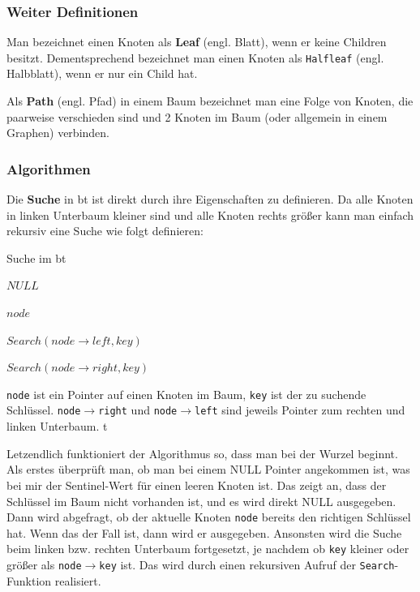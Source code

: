 \documentclass[11pt]{article}
\newcommand{\lstin}[1]{\lstinline[language=C]{#1}}
\begin{document}
\subsubsection{Weiter Definitionen}
Man bezeichnet einen Knoten als \textbf{Leaf} (engl. Blatt), wenn er keine Children besitzt. \cite[S. 36]{aic}
Dementsprechend bezeichnet man einen Knoten als \lstin{Halfleaf} (engl. Halbblatt), wenn er nur ein Child hat. 

Als \textbf{Path} (engl. Pfad) in einem Baum bezeichnet man eine Folge von Knoten, die paarweise verschieden sind und 2 Knoten im Baum (oder allgemein in einem Graphen) verbinden. \cite[S. 36]{aic}

\subsubsection{Algorithmen}

Die \textbf{Suche} in \gls{bt} ist direkt durch ihre Eigenschaften zu definieren. 
Da alle Knoten in linken Unterbaum kleiner sind und alle Knoten rechts größer kann man einfach rekursiv eine Suche wie folgt definieren:

\begin{algorithm}
  \caption{Suche im \gls{bt}}
  \begin{algorithmic}[1]
      
      \Return $NULL$
    \EndIf
      
      \Return $node$
      
      \Return $Search(node \rightarrow left, key)$
    \Else
      
      \Return $Search(node \rightarrow right, key)$
    \EndIf
  \EndProcedure
  \end{algorithmic}
\end{algorithm}

\lstin{node} ist ein Pointer auf einen Knoten im Baum, \lstin{key} ist der zu suchende Schlüssel.
\lstin{node}$\rightarrow$\lstin{right} und \lstin{node}$\rightarrow$\lstin{left} 
sind jeweils Pointer zum rechten und linken Unterbaum. t

Letzendlich funktioniert der Algorithmus so, dass man bei der Wurzel beginnt. 
Als erstes überprüft man, ob man bei einem NULL Pointer angekommen ist, was bei mir der Sentinel-Wert für einen leeren Knoten ist. 
Das zeigt an, dass der Schlüssel im Baum nicht vorhanden ist, und es wird direkt NULL ausgegeben.
Dann wird abgefragt, ob der aktuelle Knoten \lstin{node} bereits den richtigen Schlüssel hat. Wenn das der Fall ist, dann wird er ausgegeben.
Ansonsten wird die Suche beim linken bzw. rechten Unterbaum fortgesetzt, je nachdem ob \lstin{key} kleiner oder größer als \lstin{node}$\rightarrow$\lstin{key} ist.
Das wird durch einen rekursiven Aufruf der \lstin{Search}-Funktion realisiert. 
\cite[S. 203]{aic}
\end{document}
